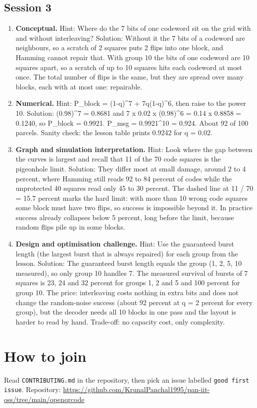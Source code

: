 \documentclass[11pt,a4paper]{article}
\begin{document}
\subsection*{Session 3}
\begin{enumerate}[nosep]
\item \textbf{Conceptual.} Hint: Where do the 7 bits of one codeword sit on the grid with and without interleaving? Solution: Without it the 7 bits of a codeword are neighbours, so a scratch of 2 squares puts 2 flips into one block, and Hamming cannot repair that. With group 10 the bits of one codeword are 10 squares apart, so a scratch of up to 10 squares hits each codeword at most once. The total number of flips is the same, but they are spread over many blocks, each with at most one: repairable.
\item \textbf{Numerical.} Hint: P\_block = (1-q)\textasciicircum{}7 + 7q(1-q)\textasciicircum{}6, then raise to the power 10. Solution: (0.98)\textasciicircum{}7 = 0.8681 and 7 x 0.02 x (0.98)\textasciicircum{}6 = 0.14 x 0.8858 = 0.1240, so P\_block = 0.9921. P\_msg = 0.9921\textasciicircum{}10 = 0.924. About 92 of 100 parcels. Sanity check: the lesson table prints 0.9242 for q = 0.02.
\item \textbf{Graph and simulation interpretation.} Hint: Look where the gap between the curves is largest and recall that 11 of the 70 code squares is the pigeonhole limit. Solution: They differ most at small damage, around 2 to 4 percent, where Hamming still reads 92 to 84 percent of codes while the unprotected 40 squares read only 45 to 30 percent. The dashed line at 11 / 70 = 15.7 percent marks the hard limit: with more than 10 wrong code squares some block must have two flips, so success is impossible beyond it. In practice success already collapses below 5 percent, long before the limit, because random flips pile up in some blocks.
\item \textbf{Design and optimisation challenge.} Hint: Use the guaranteed burst length (the largest burst that is always repaired) for each group from the lesson. Solution: The guaranteed burst length equals the group (1, 2, 5, 10 measured), so only group 10 handles 7. The measured survival of bursts of 7 squares is 23, 24 and 32 percent for groups 1, 2 and 5 and 100 percent for group 10. The price: interleaving costs nothing in extra bits and does not change the random-noise success (about 92 percent at q = 2 percent for every group), but the decoder needs all 10 blocks in one pass and the layout is harder to read by hand. Trade-off: no capacity cost, only complexity.
\end{enumerate}

\section{How to join}
Read \texttt{CONTRIBUTING.md} in the repository, then pick an issue labelled \texttt{good first issue}. Repository: \url{https://github.com/KrunalPanchal1995/pan-iit-oss/tree/main/openqrcode}
\end{document}
